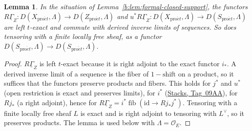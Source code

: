 \documentclass[11pt,a4paper]{article}
\numberwithin{equation}{section}
\newtheorem{lemma}[theorem]{Lemma}
\theoremstyle{definition}
\theoremstyle{remark}
\newcommand{\D}{D}
\newcommand{\proet}{\mathrm{pro}\acute{e}t}
\newcommand{\fib}{\operatorname{fib}}
\newcommand{\stacks}[1]{\href{https://stacks.math.columbia.edu/tag/#1}{\textnormal{Stacks, Tag~#1}}}
\begin{document}
\begin{lemma}\label{b:lem:formal-closed-support-b}
In the situation of Lemma~\ref{b:lem:formal-closed-support}, the functors
$R\underline\Gamma_Z\colon\D(X_{\proet},\Lambda)\to\D(Z_{\proet},\Lambda)$ and
$u^*R\underline\Gamma_Z\colon\D(X_{\proet},\Lambda)\to\D(S_{\proet},\Lambda)$
are left $t$-exact and commute with derived inverse limits of sequences.
So does tensoring with a finite locally free sheaf, as a functor
$\D(S_{\proet},\Lambda)\to\D(S_{\proet},\Lambda)$.
\end{lemma}
\begin{proof}
$R\underline\Gamma_Z$ is left $t$-exact because it is right adjoint to the
exact functor $i_*$. A derived inverse limit of a sequence is the fiber of
$1-\mathrm{shift}$ on a product, so it suffices that the functors preserve
products and fibers. This holds for $j^*$ and $u^*$ (open restriction is
exact and preserves limits), for $i^*$ (\stacks{09AA}), for $Rj_*$ (a right
adjoint), hence for $R\underline\Gamma_Z=i^*\fib(\mathrm{id}\to Rj_*j^*)$.
Tensoring with a finite locally free sheaf $L$ is exact and is right
adjoint to tensoring with $L^\vee$, so it preserves products. The lemma
is used below with $\Lambda=\mathcal O_E$.
\end{proof}
\end{document}
